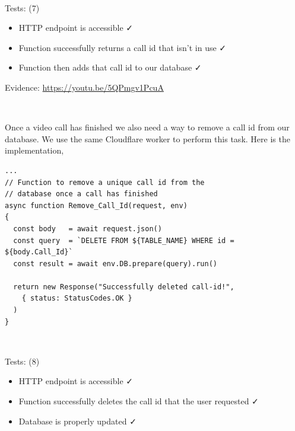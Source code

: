 {\color{gray} \hrulefill} \\ \vspace{0.2cm}

{\sffamily Tests: (7)}

\begin{itemize}
  \item HTTP endpoint is accessible \faCheck \\
  \item Function successfully returns a call id that isn't in use \faCheck \\
  \item Function then adds that call id to our database \faCheck \\
\end{itemize}

{\sffamily Evidence:} \url{https://youtu.be/5QPmgv1PcuA}\\ \vspace{0.2cm}

{\color{gray} \hrulefill} \\ \vspace{0.2cm}

Once a video call has finished we also need a way to
remove a call id from our database. We use the same
Cloudflare worker to perform this task. Here is the
implementation,

\begin{verbatim}
...
// Function to remove a unique call id from the
// database once a call has finished
async function Remove_Call_Id(request, env)
{
  const body   = await request.json()
  const query  = `DELETE FROM ${TABLE_NAME} WHERE id = ${body.Call_Id}`
  const result = await env.DB.prepare(query).run()

  return new Response("Successfully deleted call-id!",
    { status: StatusCodes.OK }
  )
}
\end{verbatim}

{\color{gray} \hrulefill} \\ \vspace{0.2cm}

{\sffamily Tests: (8)}

\begin{itemize}
  \item HTTP endpoint is accessible \faCheck \\
  \item Function successfully deletes the call id that the user requested \faCheck \\
  \item Database is properly updated \faCheck \\
\end{itemize}

